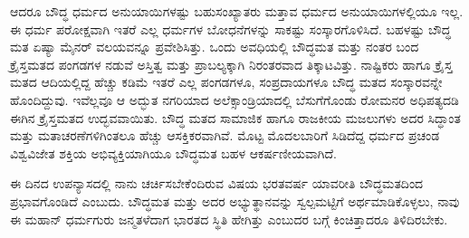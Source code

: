 ಆದರೂ ಬೌದ್ಧ ಧರ್ಮದ ಅನುಯಾಯಿಗಳಷ್ಟು ಬಹುಸಂಖ್ಯಾತರು ಮತ್ತಾವ ಧರ್ಮದ ಅನುಯಾಯಿಗಳಲ್ಲಿಯೂ ಇಲ್ಲ. ಈ ಧರ್ಮ ಪರೋಕ್ಷವಾಗಿ ಇತರೆ ಎಲ್ಲ ಧರ್ಮಗಳ ಬೋಧನೆಗಳನ್ನು ಸಾಕಷ್ಟು ಸಂಸ್ಕಾರಗೊಳಿಸಿದೆ. ಬಹಳಷ್ಟು ಬೌದ್ಧ ಮತ ಏಷ್ಯಾ ಮೈನರ್‌ ವಲಯವನ್ನೂ ಪ್ರವೇಶಿಸಿತ್ತು. ಒಂದು ಅವಧಿಯಲ್ಲಿ ಬೌದ್ಧಮತ ಮತ್ತು ನಂತರ ಬಂದ ಕ್ರೈಸ್ತಮತದ ಪಂಗಡಗಳ ನಡುವೆ ಅಸ್ತಿತ್ವ ಮತ್ತು ಪ್ರಾಬಲ್ಯಕ್ಕಾಗಿ ನಿರಂತರವಾದ ತಿಕ್ಕಾಟವಿತ್ತು. ನಾಷ್ಟಿಕರು  ಹಾಗೂ ಕ್ರೈಸ್ತ ಮತದ ಆದಿಯಲ್ಲಿದ್ದ ಹೆಚ್ಚು ಕಡಿಮೆ ಇತರೆ ಎಲ್ಲ ಪಂಗಡಗಳೂ, ಸಂಪ್ರದಾಯಗಳೂ ಬೌದ್ಧ ಮತದ ಸಂಸ್ಕಾರವನ್ನೇ ಹೊಂದಿದ್ದುವು. ಇವೆಲ್ಲವೂ ಆ ಅದ್ಭುತ ನಗರಿಯಾದ ಅಲೆಕ್ಸಾಂಡ್ರಿಯಾದಲ್ಲಿ ಬೆಸುಗೆಗೊಂಡು ರೋಮನರ ಅಧಿಪತ್ಯದಡಿ ಈಗಿನ ಕ್ರೈಸ್ತಮತದ ಉದ್ಭವವಾಯಿತು. ಬೌದ್ಧ ಮತದ ಸಾಮಾಜಿಕ ಹಾಗೂ ರಾಜಕೀಯ ಮಜಲುಗಳು ಅದರ ಸಿದ್ಧಾಂತ ಮತ್ತು ಮತಾಚರಣೆಗಳಿಗಿಂತಲೂ ಹೆಚ್ಚು ಆಸಕ್ತಿಕರವಾಗಿವೆ. ಮೊಟ್ಟ ಮೊದಲಬಾರಿಗೆ ಸಿಡಿದೆದ್ದ ಧರ್ಮದ ಪ್ರಚಂಡ ವಿಶ್ವವಿಜೇತ ಶಕ್ತಿಯ ಅಭಿವ್ಯಕ್ತಿಯಾಗಿಯೂ ಬೌದ್ಧಮತ ಬಹಳ ಆಕರ್ಷಣೀಯವಾಗಿದೆ.

ಈ ದಿನದ ಉಪನ್ಯಾಸದಲ್ಲಿ ನಾನು ಚರ್ಚಿಸಬೇಕೆಂದಿರುವ ವಿಷಯ ಭರತವರ್ಷ ಯಾವರೀತಿ ಬೌದ್ಧಮತದಿಂದ ಪ್ರಭಾವಗೊಂಡಿದೆ ಎಂಬುದು. ಬೌದ್ಧಮತ ಮತ್ತು ಅದರ ಅಭ್ಯುತ್ಥಾನವನ್ನು ಸ್ವಲ್ಪಮಟ್ಟಿಗೆ ಅರ್ಥಮಾಡಿಕೊಳ್ಳಲು, ನಾವು ಈ ಮಹಾನ್ ಧರ್ಮಗುರು ಜನ್ಮತಳೆದಾಗ ಭಾರತದ ಸ್ಥಿತಿ ಹೇಗಿತ್ತು ಎಂಬುದರ ಬಗ್ಗೆ ಕಿಂಚಿತ್ತಾದರೂ ತಿಳಿದಿರಬೇಕು.

